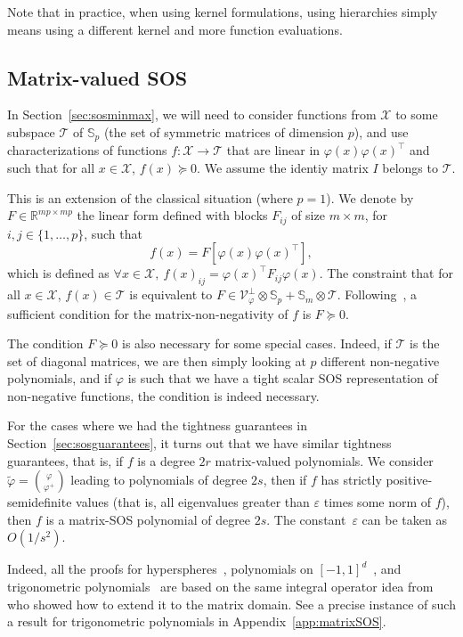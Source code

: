 \documentclass[11pt]{article}
\newcommand{\idm}{I}
\newcommand{\rb}{\mathbb{R}}
\newcommand{\mysec}[1]{Section~\ref{sec:#1}}
\def \X{{\mathcal X}}
\def \V{{\mathcal V}}
\begin{document}
Note that in practice, when using kernel formulations, using hierarchies simply means using a different kernel and more function evaluations.

\subsection{Matrix-valued SOS}
\label{sec:matrixSOS}
In \mysec{sosminmax}, we will need to consider functions from $\X$ to some subspace $\mathcal{T}$ of $\mathbb{S}_p$ (the set of symmetric matrices of dimension $p$), and use characterizations of functions $f: \X \to \mathcal{T}$ that are linear in $\varphi(x) \varphi(x)^\top$ and such that for all $x \in \X$, $f(x) \succcurlyeq 0$. We assume the identiy matrix $\idm$ belongs to $\mathcal{T}$.

This is an extension of the classical situation (where $p=1$). We denote by $F \in \rb^{mp \times mp}$ the linear form defined with blocks $F_{ij}$ of size $m \times m$, for $i,j \in \{1,\dots,p\}$, such that 
  \[
  f(x) = F[ \varphi(x) \varphi(x)^\top],
  \]
  which is defined as $\forall x \in \X, \ f(x)_{ij} = \varphi(x)^\top F_{ij} \varphi(x)$. The constraint that for all $x \in \X$, $f(x) \in \mathcal{T}$ is equivalent to $F \in  \V_\varphi^\perp \otimes \mathbb{S}_p + \mathbb{S}_m \otimes \mathcal{T}$. Following~\cite{scherer2006matrix,fang2021sum,muzellec2021learning}, a sufficient condition for the matrix-non-negativity of $f$ is $F \succcurlyeq 0$. 

The condition $F \succcurlyeq 0$ is also necessary for some special cases. Indeed, if $\mathcal{T}$ is the set of diagonal matrices, we are then simply looking at $p$ different non-negative polynomials, and if $\varphi$ is such that we have a tight scalar SOS representation of non-negative functions, the condition is indeed necessary.

For the cases where we had the tightness guarantees in \mysec{sosguarantees}, it turns out that we have similar tightness guarantees, that is, if $f$ is a degree $2r$ matrix-valued polynomials. We consider $\tilde{\varphi} = { \varphi \choose \varphi^+  } $ leading to polynomials of degree $2s$, then if $f$ has strictly positive-semidefinite values (that is, all eigenvalues greater than $\varepsilon$ times some norm of $f$), then $f$ is a matrix-SOS polynomial of degree $2s$. The constant~$\varepsilon$ can be taken as $O(1/s^2)$.

Indeed, all the proofs for hyperspheres~\cite{fang2021sum}, polynomials on $[-1,1]^d$~\cite{laurent2022effective}, and trigonometric polynomials~\cite{bach2022exponential} are based on the same integral operator idea from~\cite{fang2021sum} who showed how to extend it to the matrix domain. See a precise instance of such a result for trigonometric polynomials in Appendix~\ref{app:matrixSOS}.
\end{document}
